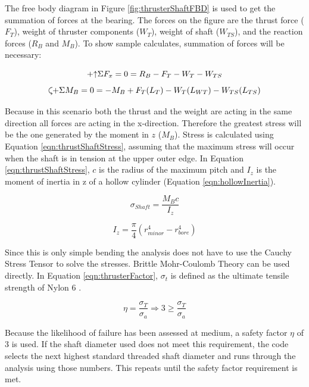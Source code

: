 \documentclass[../main.tex]{subfiles}
\begin{document}
The free body diagram in Figure \ref{fig:thrusterShaftFBD} is used to get the summation of forces at the bearing. The forces on the figure are the thrust force ($F_T$), weight of thruster components ($W_T$), weight of shaft ($W_{TS}$), and the reaction forces ($R_B$ and $M_B$). To show sample calculates, summation of forces will be necessary:

\begin{equation}
\label{eqn:thrustShaftFx} 
\mathbin{+\mathord\uparrow} \Sigma F_x  = 0 = R_B - F_T - W_T - W_{TS}
\end{equation}
\begin{equation}
\label{eqn:thrustShaftMB} 
\curveplus \Sigma M_B = 0 = -M_B + F_T(L_T) - W_T(L_{WT}) - W_{TS}(L_{TS})
\end{equation}

Because in this scenario both the thrust and the weight are acting in the same direction all forces are acting in the x-direction. Therefore the greatest stress will be the one generated by the moment in $z$ ($M_B$). Stress is calculated using Equation \ref{eqn:thrustShaftStress}, assuming that the maximum stress will occur when the shaft is in tension at the upper outer edge. In Equation \ref{eqn:thrustShaftStress}, $c$ is the radius of the maximum pitch and $I_z$ is the moment of inertia in z of a hollow cylinder (Equation \ref{eqn:hollowInertia}).

\begin{equation}
\label{eqn:thrustShaftStress} 
\sigma _{Shaft}  = \dfrac{M_{B}c}{I_z} 
\end{equation}

\begin{equation}
\label{eqn:hollowInertia} 
I _{z}  = \dfrac{\pi}{4} (r_{minor}^4 - r_{bore}^4)
\end{equation}

Since this is only simple bending the analysis does not have to use the Cauchy Stress Tensor to solve the stresses. Brittle Mohr-Coulomb Theory \cite[227]{shigley} can be used directly. In Equation \ref{eqn:thrusterFactor}, $\sigma_{t}$ is defined as the ultimate tensile strength of Nylon 6 \cite{Nylon6}.

\begin{equation} \label{eqn:thrusterFactor}
\eta = \dfrac{\sigma_{T}}{\sigma _a} \Rightarrow 3 \geq \dfrac{\sigma_{T}}{\sigma _a}
\end{equation}

Because the likelihood of failure has been assessed at medium, a safety factor $\eta$ of 3 is used. If the shaft diameter used does not meet this requirement, the code selects the next highest standard threaded shaft diameter and runs through the analysis using those numbers. This repeats until the safety factor requirement is met. 
\end{document}
